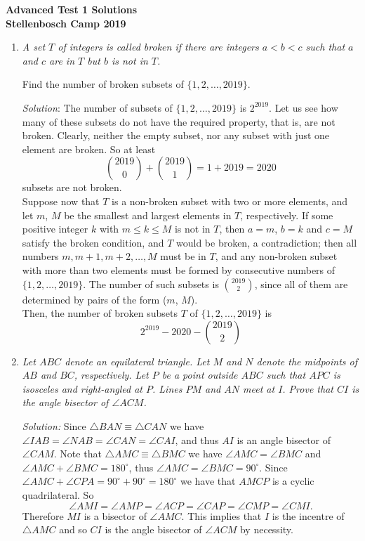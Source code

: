 \documentclass{article}
\begin{document}
\begin{center}
  \textbf{\Large Advanced Test 1 Solutions}
  \\ \vspace{1em}
  \textbf{\large Stellenbosch Camp 2019}
\end{center}


\begin{enumerate}[1.]

\item %
{\itshape
A set $T$ of integers is called \emph{broken} if there are integers $a < b < c$ such that $a$ and $c$ are in $T$ but $b$ is not in $T$.

Find the number of broken subsets of $\{1, 2, \dotsc, 2019\}$.}

\textit{Solution}:
The number of subsets of $\{1, 2, \dots, 2019\}$ is $2^{2019}$. Let us see how many of these subsets do not have the required property, that is, are not broken.
Clearly, neither the empty subset, nor any subset with just one element are broken. So at least
$$\binom{2019}{0} + \binom{2019}{1} = 1 + 2019 = 2020$$
subsets are not broken.\\
Suppose now that $T$ is a non-broken subset with two or more elements, and let $m$, $M$ be the smallest and largest elements in $T$, respectively. If some positive integer $k$ with $m \le k \le M$ is not in $T$, then $a = m$, $b = k$ and $c = M$ satisfy the broken condition, and $T$ would be broken, a contradiction; then all numbers $m, m + 1, m + 2, \dots, M$ must be in $T$, and any non-broken subset with more than two elements must be formed by consecutive numbers of $\{1, 2, \dots, 2019\}$.
The number of such subsets is $\binom{2019}{2}$, since all of them are determined by pairs of the form ($m$, $M$).\\
Then, the number of broken subsets $T$ of $\{1, 2, \dots, 2019\}$ is
$$2^{2019} - 2020 - \binom{2019}{2}$$


\item %
{\itshape
Let $ABC$ denote an equilateral triangle.
Let $M$ and $N$ denote the midpoints of $AB$ and $BC$, respectively.
Let $P$ be a point outside $ABC$ such that $APC$ is isosceles and right-angled at $P$.
Lines $PM$ and $AN$ meet at $I$.
Prove that $CI$ is the angle bisector of $\angle ACM$.}

\textit{Solution:}
Since $\triangle BAN \equiv \triangle CAN$ we have $\angle IAB = \angle NAB = \angle CAN = \angle CAI $, and thus $AI$ is an angle bisector of $\angle CAM$. Note that $\triangle AMC \equiv \triangle BMC$ we have $\angle AMC = \angle BMC$ and $\angle AMC + \angle BMC =180^\circ$, thus $\angle AMC = \angle BMC = 90^\circ$. Since $\angle AMC + \angle CPA = 90^\circ +90^\circ =180^\circ$ we have that $AMCP$ is a cyclic quadrilateral. So
\[ \angle AMI = \angle AMP = \angle ACP = \angle CAP = \angle CMP = \angle CMI. \]
Therefore $MI$ is a bisector of $\angle AMC$. This implies that $I$ is the incentre of $\triangle AMC$ and so $CI$ is the angle bisector of $\angle ACM$ by necessity.



\end{enumerate}
\end{document}
